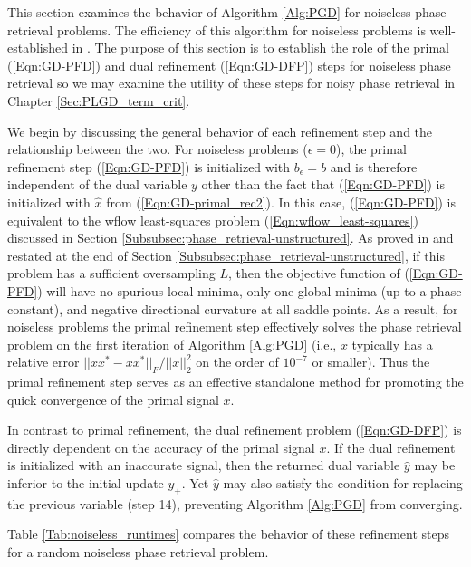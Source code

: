 This section examines the behavior of Algorithm \ref{Alg:PGD} for noiseless phase retrieval problems.  The efficiency of this algorithm for noiseless problems is well-established in \cite[Sections 5.1.1, 5.1.3]{DBLP:journals/siamsc/FriedlanderM16}.  The purpose of this section is to establish the role of the primal (\ref{Eqn:GD-PFD}) and dual refinement (\ref{Eqn:GD-DFP}) steps for noiseless phase retrieval so we may examine the utility of these steps for noisy phase retrieval in Chapter \ref{Sec:PLGD_term_crit}.

We begin by discussing the general behavior of each refinement step and the relationship between the two.  
For noiseless problems ($\epsilon = 0$), the primal refinement step (\ref{Eqn:GD-PFD}) is initialized with $b_\epsilon = b$ and is therefore independent of the dual variable $y$ other than the fact that (\ref{Eqn:GD-PFD}) is initialized with $\hat{x}$ from (\ref{Eqn:GD-primal_rec2}).  
In this case, (\ref{Eqn:GD-PFD}) is equivalent to the wflow least-squares problem (\ref{Eqn:wflow_least-squares}) discussed in Section \ref{Subsubsec:phase_retrieval-unstructured}.  As proved in \cite{sun2016geometric} and restated at the end of Section \ref{Subsubsec:phase_retrieval-unstructured}, if this problem has a sufficient oversampling $L$, then the objective function of (\ref{Eqn:GD-PFD}) will have no spurious local minima, only one global minima (up to a phase constant), and negative directional curvature at all saddle points.  As a result, for noiseless problems the primal refinement step effectively solves the phase retrieval problem on the first iteration of Algorithm \ref{Alg:PGD} (i.e., $x$ typically has a relative error $|| \bar{x}\bar{x}^* - xx^* ||_F / ||\bar{x}||_2^2$ on the order of $10^{-7}$ or smaller).  Thus the primal refinement step serves as an effective standalone method for promoting the quick convergence of the primal signal $x$.

In contrast to primal refinement, the dual refinement problem (\ref{Eqn:GD-DFP}) is directly dependent on the accuracy of the primal signal $x$.  If the dual refinement is initialized with an inaccurate signal, then the returned dual variable $\hat{y}$ may be inferior to the initial update $y_+$.  Yet $\hat{y}$ may also satisfy the condition for replacing the previous variable (step 14), preventing Algorithm \ref{Alg:PGD} from converging.

Table \ref{Tab:noiseless_runtimes} compares the behavior of these refinement steps for a random noiseless phase retrieval problem.

